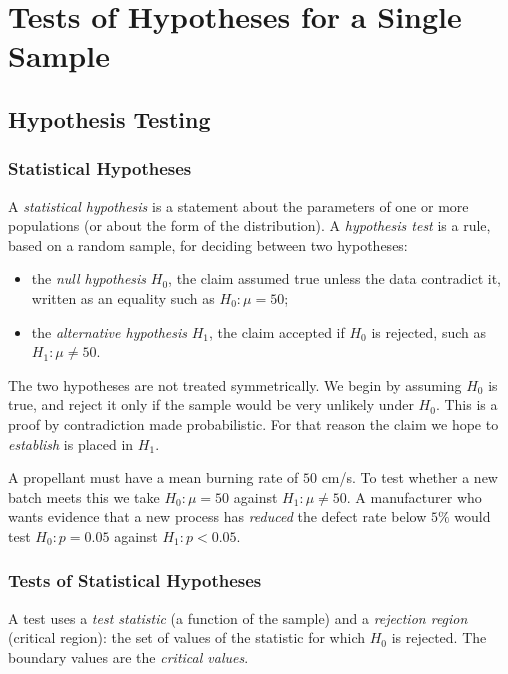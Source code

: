 \chapter{Tests of Hypotheses for a Single Sample}

\section{Hypothesis Testing}

\subsection{Statistical Hypotheses}

\begin{definition}
A \emph{statistical hypothesis} is a statement about the parameters of one or more populations (or about the form of the distribution). A \emph{hypothesis test} is a rule, based on a random sample, for deciding between two hypotheses:
\begin{itemize}
  \item the \emph{null hypothesis} $H_0$, the claim assumed true unless the data contradict it, written as an equality such as $H_0:\mu=50$;
  \item the \emph{alternative hypothesis} $H_1$, the claim accepted if $H_0$ is rejected, such as $H_1:\mu\ne50$.
\end{itemize}
\end{definition}

The two hypotheses are not treated symmetrically. We begin by assuming $H_0$ is true, and reject it only if the sample would be very unlikely under $H_0$. This is a proof by contradiction made probabilistic. For that reason the claim we hope to \emph{establish} is placed in $H_1$.

\begin{example}
A propellant must have a mean burning rate of $50$ cm/s. To test whether a new batch meets this we take $H_0:\mu=50$ against $H_1:\mu\ne50$. A manufacturer who wants evidence that a new process has \emph{reduced} the defect rate below $5\%$ would test $H_0:p=0.05$ against $H_1:p<0.05$.
\end{example}

\subsection{Tests of Statistical Hypotheses}

A test uses a \emph{test statistic} (a function of the sample) and a \emph{rejection region} (critical region): the set of values of the statistic for which $H_0$ is rejected. The boundary values are the \emph{critical values}.

